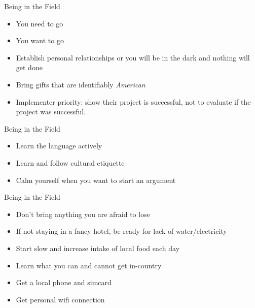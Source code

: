 \documentclass[11pt,ignorenonframetext,xcolor={svgnames}]{beamer}
\providecommand{\tightlist}{%
  \setlength{\itemsep}{0pt}\setlength{\parskip}{0pt}}
\begin{document}
\begin{frame}{Being in the Field}
\protect\hypertarget{being-in-the-field}{}
\begin{itemize}
\tightlist
\item
  You need to go
\item
  You want to go
\item
  Establish personal relationships or you will be in the dark and
  nothing will get done
\item
  Bring gifts that are identifiably \emph{American}
\end{itemize}

\smallskip

\begin{itemize}
\tightlist
\item
  Implementer priority: show their project is successful, not to
  evaluate if the project was successful.
\end{itemize}

\end{frame}

\begin{frame}{Being in the Field}
\protect\hypertarget{being-in-the-field-1}{}
\begin{itemize}
\tightlist
\item
  Learn the language actively
\item
  Learn and follow cultural etiquette
\item
  Calm yourself when you want to start an argument
\end{itemize}
\end{frame}

\begin{frame}{Being in the Field}
\protect\hypertarget{being-in-the-field-2}{}
\begin{itemize}
\tightlist
\item
  Don't bring anything you are afraid to lose
\item
  If not staying in a fancy hotel, be ready for lack of
  water/electricity
\end{itemize}

\medskip

\begin{itemize}
\tightlist
\item
  Start slow and increase intake of local food each day
\item
  Learn what you can and cannot get in-country
\item
  Get a local phone and simcard
\item
  Get personal wifi connection
\end{itemize}
\end{frame}
\end{document}
